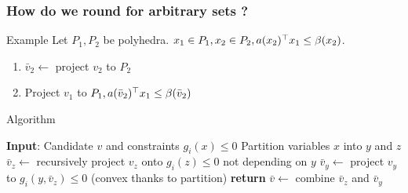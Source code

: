 \documentclass{beamer}
\begin{document}
\begin{frame}[fragile]
  \frametitle{How do we round for arbitrary sets ?}
  \begin{block}{Example}
    Let $P_1, P_2$ be polyhedra.
    $x_1 \in P_1, x_2 \in P_2, a(x_2)^\top x_1 \le \beta(x_2)$.
    \begin{enumerate}
      \item $\bar{v}_2 \gets$ project $v_2$ to $P_2$
      \item Project $v_1$ to $P_1, a(\bar{v}_2)^\top x_1 \le \beta(\bar{v}_2)$
    \end{enumerate}
  \end{block}
  \begin{block}{Algorithm}
    \vspace{0.3em}
  \begin{algorithmic}
    \STATE \textbf{Input}: Candidate $v$ and constraints $g_i(x) \le 0$
    \STATE \alert{Partition} variables $x$ into $y$ and $z$
    \STATE $\bar{v}_z \gets$ recursively project $v_z$ onto $g_i(z) \le 0$ not depending on $y$
    \STATE $\bar{v}_y \gets$ project $v_y$ to $g_i(y, \bar{v}_z) \le 0$ (convex thanks to \alert{partition})
    \STATE \textbf{return} $\bar{v} \gets$ combine $\bar{v}_z$ and $\bar{v}_y$
  \end{algorithmic}
  \end{block}
\end{frame}
\end{document}

